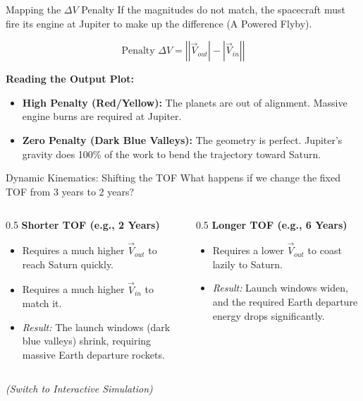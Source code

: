 \documentclass[aspectratio=169]{beamer}
\begin{document}
\begin{frame}{Mapping the $\Delta V$ Penalty}
    If the magnitudes do not match, the spacecraft must fire its engine at Jupiter to make up the difference (A Powered Flyby).
    
    \begin{equation}
        \text{Penalty } \Delta V = \left| |\vec{V}_{out}| - |\vec{V}_{in}| \right|
    \end{equation}
    
    \vspace{0.3cm}
    \textbf{Reading the Output Plot:}
    \begin{itemize}
        \item \textbf{High Penalty (Red/Yellow):} The planets are out of alignment. Massive engine burns are required at Jupiter.
        \item \textbf{Zero Penalty (Dark Blue Valleys):} The geometry is perfect. Jupiter's gravity does 100\% of the work to bend the trajectory toward Saturn.
    \end{itemize}
\end{frame}

\begin{frame}{Dynamic Kinematics: Shifting the TOF}
    What happens if we change the fixed TOF from 3 years to 2 years?
    
    \vspace{0.3cm}
    \begin{columns}
        \begin{column}{0.5\textwidth}
            \textbf{Shorter TOF (e.g., 2 Years)}
            \begin{itemize}
                \item Requires a much higher $\vec{V}_{out}$ to reach Saturn quickly.
                \item Requires a much higher $\vec{V}_{in}$ to match it.
                \item \textit{Result:} The launch windows (dark blue valleys) shrink, requiring massive Earth departure rockets.
            \end{itemize}
        \end{column}
        \begin{column}{0.5\textwidth}
            \textbf{Longer TOF (e.g., 6 Years)}
            \begin{itemize}
                \item Requires a lower $\vec{V}_{out}$ to coast lazily to Saturn.
                \item \textit{Result:} Launch windows widen, and the required Earth departure energy drops significantly.
            \end{itemize}
        \end{column}
    \end{columns}
    \vspace{0.5cm}
    \centering \textit{(Switch to Interactive Simulation)}
\end{frame}
\end{document}

